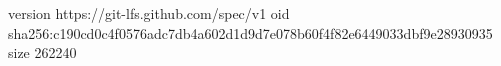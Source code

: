 version https://git-lfs.github.com/spec/v1
oid sha256:c190cd0c4f0576adc7db4a602d1d9d7e078b60f4f82e6449033dbf9e28930935
size 262240

